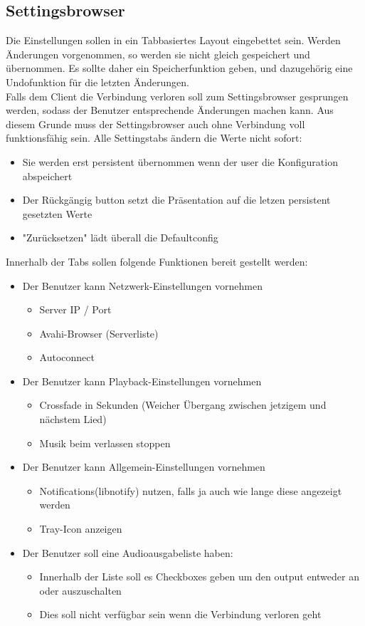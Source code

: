 \subsection{Settingsbrowser}
Die Einstellungen sollen in ein Tabbasiertes Layout eingebettet sein. 
Werden Änderungen vorgenommen, so werden sie nicht gleich gespeichert und übernommen. 
Es sollte daher ein Speicherfunktion geben, und dazugehörig eine Undofunktion für die letzten Änderungen.
\\
Falls dem Client die Verbindung verloren soll zum Settingsbrowser gesprungen werden, sodass der Benutzer entsprechende
Änderungen machen kann. Aus diesem Grunde muss der Settingsbrowser auch ohne Verbindung voll funktionsfähig sein.
Alle Settingstabs ändern die Werte nicht sofort:
\begin{itemize} 
   \item Sie werden erst persistent übernommen wenn der user die Konfiguration abspeichert
   \item Der Rückgängig button setzt die Präsentation auf die letzen persistent gesetzten Werte
   \item "Zurücksetzen" lädt überall die Defaultconfig
\end{itemize}
Innerhalb der Tabs sollen folgende Funktionen bereit gestellt werden:
\begin{itemize}
	\item Der Benutzer kann Netzwerk-Einstellungen vornehmen
	\begin{itemize}
		\item Server IP / Port
		\item Avahi-Browser (Serverliste)
		\item Autoconnect
	\end{itemize}
	\item Der Benutzer kann Playback-Einstellungen vornehmen	
	\begin{itemize}
		\item Crossfade in Sekunden (Weicher Übergang zwischen jetzigem und nächstem Lied)
		\item Musik beim verlassen stoppen
	\end{itemize}
	\item Der Benutzer kann Allgemein-Einstellungen vornehmen
	\begin{itemize}
		\item Notifications(libnotify) nutzen, falls ja auch wie lange diese angezeigt werden
		\item Tray-Icon anzeigen
	\end{itemize}
	\item Der Benutzer soll eine Audioausgabeliste haben:
	\begin{itemize}
		\item Innerhalb der Liste soll es Checkboxes geben um den output entweder an oder auszuschalten
		\item Dies soll nicht verfügbar sein wenn die Verbindung verloren geht
	\end{itemize}
\end{itemize}

